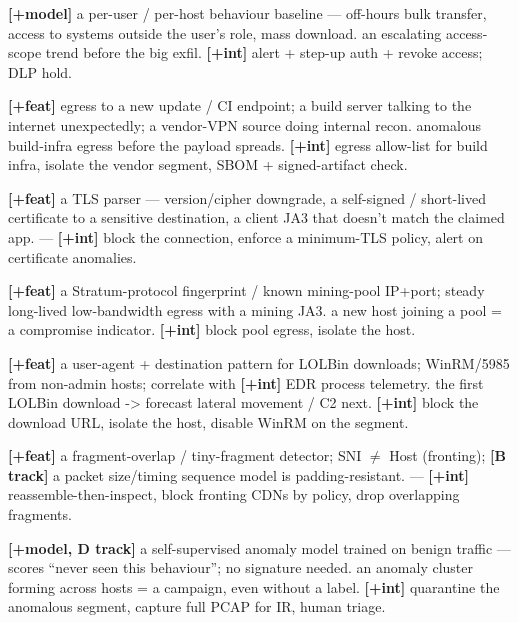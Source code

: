 \documentclass[11pt,a4paper]{article}
\begin{document}
{\textbf{[+model]} a per-user / per-host behaviour baseline --- off-hours bulk transfer, access to systems outside the user's role, mass download.}
{an escalating access-scope trend before the big exfil.}
{\textbf{[+int]} alert + step-up auth + revoke access; DLP hold.}

{\textbf{[+feat]} egress to a new update / CI endpoint; a build server talking to the internet unexpectedly; a vendor-VPN source doing internal recon.}
{anomalous build-infra egress before the payload spreads.}
{\textbf{[+int]} egress allow-list for build infra, isolate the vendor segment, SBOM + signed-artifact check.}

{\textbf{[+feat]} a TLS parser --- version/cipher downgrade, a self-signed / short-lived certificate to a sensitive destination, a client JA3 that doesn't match the claimed app.}
{---}
{\textbf{[+int]} block the connection, enforce a minimum-TLS policy, alert on certificate anomalies.}

{\textbf{[+feat]} a Stratum-protocol fingerprint / known mining-pool IP+port; steady long-lived low-bandwidth egress with a mining JA3.}
{a new host joining a pool = a compromise indicator.}
{\textbf{[+int]} block pool egress, isolate the host.}

{\textbf{[+feat]} a user-agent + destination pattern for LOLBin downloads; WinRM/5985 from non-admin hosts; correlate with \textbf{[+int]} EDR process telemetry.}
{the first LOLBin download -> forecast lateral movement / C2 next.}
{\textbf{[+int]} block the download URL, isolate the host, disable WinRM on the segment.}

{\textbf{[+feat]} a fragment-overlap / tiny-fragment detector; SNI $\neq$ Host (fronting); \textbf{[B track]} a packet size/timing sequence model is padding-resistant.}
{---}
{\textbf{[+int]} reassemble-then-inspect, block fronting CDNs by policy, drop overlapping fragments.}

{\textbf{[+model, D track]} a self-supervised anomaly model trained on benign traffic --- scores ``never seen this behaviour''; no signature needed.}
{an anomaly cluster forming across hosts = a campaign, even without a label.}
{\textbf{[+int]} quarantine the anomalous segment, capture full PCAP for IR, human triage.}
\end{document}
